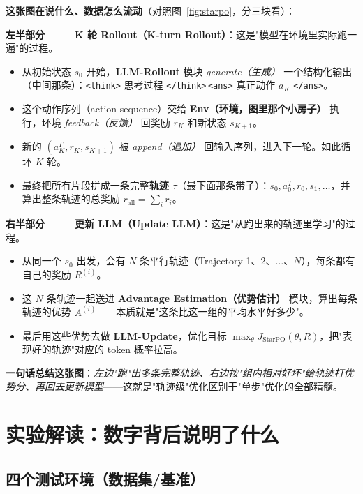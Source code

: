\documentclass[11pt,UTF8,fontset=fandol]{ctexart}
\begin{document}
\textbf{这张图在说什么、数据怎么流动}（对照图~\ref{fig:starpo}，分三块看）：

\textbf{左半部分 —— K 轮 Rollout（K-turn Rollout）}：这是"模型在环境里实际跑一遍"的过程。
\begin{itemize}[leftmargin=1.4em,itemsep=2pt,topsep=2pt]
\item 从初始状态 $s_0$ 开始，\textbf{LLM-Rollout} 模块 \emph{generate（生成）} 一个结构化输出（中间那条）：\texttt{<think>} 思考过程 \texttt{</think>}\,\texttt{<ans>} 真正动作 $a_K$ \texttt{</ans>}。
\item 这个动作序列（action sequence）交给 \textbf{Env（环境，图里那个小房子）} 执行，环境 \emph{feedback（反馈）} 回奖励 $r_K$ 和新状态 $s_{K+1}$。
\item 新的 $(a^T_K, r_K, s_{K+1})$ 被 \emph{append（追加）} 回输入序列，进入下一轮。如此循环 $K$ 轮。
\item 最终把所有片段拼成一条完整\textbf{轨迹 $\tau$}（最下面那条带子）：$s_0,a^T_0,r_0,s_1,\dots$，并算出整条轨迹的总奖励 $r_{\text{all}}=\sum_i r_i$。
\end{itemize}

\textbf{右半部分 —— 更新 LLM（Update LLM）}：这是"从跑出来的轨迹里学习"的过程。
\begin{itemize}[leftmargin=1.4em,itemsep=2pt,topsep=2pt]
\item 从同一个 $s_0$ 出发，会有 $N$ 条平行轨迹（Trajectory 1、2、$\dots$、$N$），每条都有自己的奖励 $R^{(i)}$。
\item 这 $N$ 条轨迹一起送进 \textbf{Advantage Estimation（优势估计）} 模块，算出每条轨迹的优势 $A^{(i)}$——本质就是"这条比这一组的平均水平好多少"。
\item 最后用这些优势去做 \textbf{LLM-Update}，优化目标 $\max_\theta J_{\text{StarPO}}(\theta,R)$，把"表现好的轨迹"对应的 token 概率拉高。
\end{itemize}

\textbf{一句话总结这张图}：\emph{左边"跑"出多条完整轨迹、右边按"组内相对好坏"给轨迹打优势分、再回去更新模型}——这就是"轨迹级"优化区别于"单步"优化的全部精髓。

\section{实验解读：数字背后说明了什么}

\subsection{四个测试环境（数据集/基准）}
\end{document}
